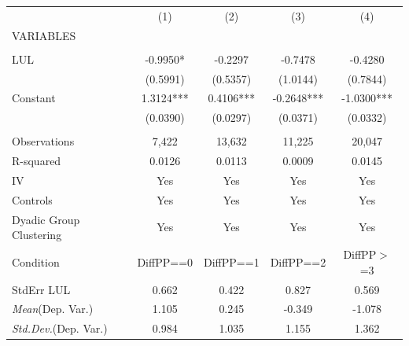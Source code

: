 \documentclass[]{article}
\begin{document}
\begin{tabular}{lcccc} \hline
 & (1) & (2) & (3) & (4) \\
VARIABLES &  &  &  &  \\ \hline
 &  &  &  &  \\
LUL & -0.9950* & -0.2297 & -0.7478 & -0.4280 \\
 & (0.5991) & (0.5357) & (1.0144) & (0.7844) \\
Constant & 1.3124*** & 0.4106*** & -0.2648*** & -1.0300*** \\
 & (0.0390) & (0.0297) & (0.0371) & (0.0332) \\
 &  &  &  &  \\
Observations & 7,422 & 13,632 & 11,225 & 20,047 \\
R-squared & 0.0126 & 0.0113 & 0.0009 & 0.0145 \\
IV & Yes & Yes & Yes & Yes \\
Controls & Yes & Yes & Yes & Yes \\
Dyadic Group Clustering & Yes & Yes & Yes & Yes \\
Condition & DiffPP==0 & DiffPP==1 & DiffPP==2 & DiffPP$>$=3 \\
StdErr LUL & 0.662 & 0.422 & 0.827 & 0.569 \\
\textit{Mean}(Dep. Var.) & 1.105 & 0.245 & -0.349 & -1.078 \\
 \textit{Std.Dev.}(Dep. Var.) & 0.984 & 1.035 & 1.155 & 1.362 \\ \hline
\end{tabular}
\end{document}
